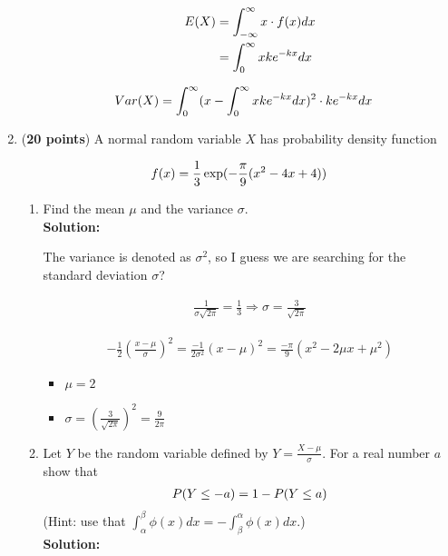 \documentclass[a4paper]{article}
\begin{document}
\begin{enumerate}
\begin{enumerate}
\begin{align}
E(X) &= \int_{-\infty}^{\infty} x \cdot f(x)dx\notag\\
	 &= \int_0^\infty x ke^{-kx}dx\notag 
\end{align}	
	
	
\begin{align}
Var(X) &= \int_{0}^{\infty} (x - \int_0^\infty x ke^{-kx}dx)^2 \cdot ke^{-kx}dx\notag
\end{align}
	
	
\end{enumerate}



\item (\textbf{20 points}) A normal random variable $X$ has probability density function

\begin{align}
f(x) = \frac{1}{3}\exp(-\frac{\pi}{9}(x^2 - 4x + 4))\notag
\end{align}



\begin{enumerate}
	\item Find the mean $\mu$ and the variance $\sigma$.\\
	\textbf{Solution:}

The variance is denoted as $\sigma^2$, so I guess we are searching for the standard deviation $\sigma$?

\begin{align*}
\frac{1}{\sigma \sqrt{2 \pi}} = \frac{1}{3} \Rightarrow \sigma = \frac{3}{\sqrt{2 \pi}}
\end{align*}

\begin{align*}
- \frac{1}{2} \left( \frac{x - \mu }{\sigma}\right)^2 = \frac{-1}{2 \sigma^2}(x - \mu)^2 = \frac{- \pi}{9}(x^2 - 2 \mu x + \mu^2)
\end{align*}

\begin{itemize}
	\item $\mu = 2$
	\item $\sigma = (\frac{3}{\sqrt{2 \pi}})^2 = \frac{9}{2 \pi}$
\end{itemize}



	
	\item Let $Y$ be the random variable defined by $Y = \frac{X - \mu}{\sigma}$. For a real number $a$ show that \begin{align}
	P(Y \leq -a) = 1 - P(Y \leq a)\notag
	\end{align}
	(Hint: use that $\int_\alpha^\beta \phi(x)dx = -\int_\beta^\alpha \phi(x)dx.$)\\
	\textbf{Solution:}



\end{enumerate}
\end{enumerate}
\end{document}
